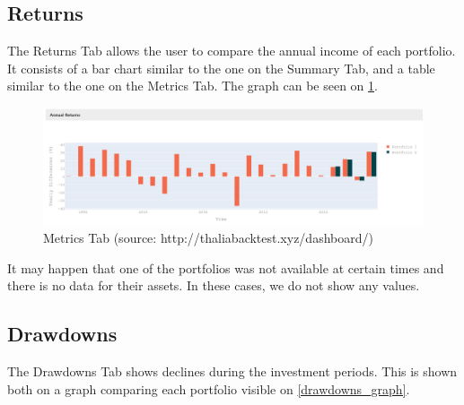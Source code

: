 \documentclass[main.tex]{subfiles}
\begin{document}
\subsection*{Returns}



The Returns Tab allows the user to compare the annual income of each portfolio. It consists of a bar chart similar to the one on the Summary Tab, and a table similar to the one on the Metrics Tab. The graph can be seen on \figurename{\ref{returns}}.



\begin{figure}[H]

   \centering

   \includegraphics[width=\textwidth]{08Appendices/081User/081Pictures/returns_graph.png}

   \caption{Metrics Tab (source: http://thaliabacktest.xyz/dashboard/)}

   \label{returns}

\end{figure}



It may happen that one of the portfolios was not available at certain times and there is no data for their assets. In these cases, we do not show any values. 



\subsection*{Drawdowns}



The Drawdowns Tab shows declines during the investment periods. This is shown both on a graph comparing each portfolio visible on \figurename{\ref{drawdowns_graph}}.
\end{document}
